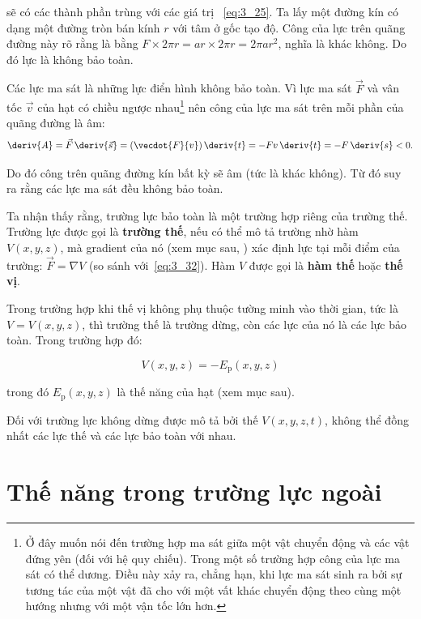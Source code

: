 \noindent
sẽ có các thành phần trùng với các giá trị ~\eqref{eq:3_25}. Ta lấy một đường kín có dạng một đường tròn bán kính $r$ với tâm ở gốc tạo độ. Công của lực trên quãng đường này rõ rằng là bằng $F\times 2\pi r=ar\times 2\pi r=2\pi ar^2$, nghĩa là khác không. Do đó lực là không bảo toàn.

 Các lực ma sát là những lực điển hình không bảo toàn. Vì lực ma sát $\vec{F}$ và vân tốc $\vec{v}$ của hạt có chiều ngược nhau\footnote{Ở đây muốn nói đến trường hợp ma sát giữa một vật chuyển động và các vật đứng yên (đối với hệ quy chiếu). Trong một số trường hợp công của lực ma sát có thể dương. Điều này xảy ra, chẳng hạn, khi lực ma sát sinh ra bởi sự tương tác của một vật đã cho với một vất khác chuyển động  theo cùng một hướng nhưng với một vận tốc lớn hơn.} nên công của lực ma sát trên mỗi phần của quãng đường là âm:
\begin{equation*}
\deriv{A} = \vec{F}\,\deriv{\vec{s}} = (\vecdot{F}{v})\,\deriv{t} = -Fv\,\deriv{t} = -F\,\deriv{s}<0.
\end{equation*}

\noindent
Do đó công trên quãng đường kín bất kỳ sẽ âm (tức là khác không). Từ đó suy ra rằng các lực ma sát đều không bảo toàn.

Ta nhận thấy rằng, trường lực bảo toàn là một trường hợp riêng của trường thế. Trường lực được gọi là \textbf{trường thế}, nếu có thể mô tả trường nhờ hàm $V(x,y,z)$, mà gradient của nó (xem mục sau, ) xác định lực tại mỗi điểm của trường: $\vec{F}=\nabla V$ (so sánh với~\eqref{eq:3_32}). Hàm $V$ được gọi là \textbf{hàm thế} hoặc \textbf{thế vị}.

Trong trường hợp khi thế vị không phụ thuộc tường minh vào thời gian, tức là $V=V(x,y,z)$, thì trường thế là trường dừng, còn các lực của nó là các lực bảo toàn. Trong trường hợp đó: 


\begin{equation*}
V(x,y,z) = -E_{\text{p}}(x,y,z)
\end{equation*}

\noindent
trong đó $E_{\text{p}}(x,y,z)$ là thế năng của hạt (xem mục sau).

Đối với trường lực không dừng được mô tả bởi thế $V(x,y,z,t)$, không thể đồng nhất các lực thế và các lực bảo toàn với nhau.

\section{Thế năng trong trường lực ngoài}\label{sec:3_5}

